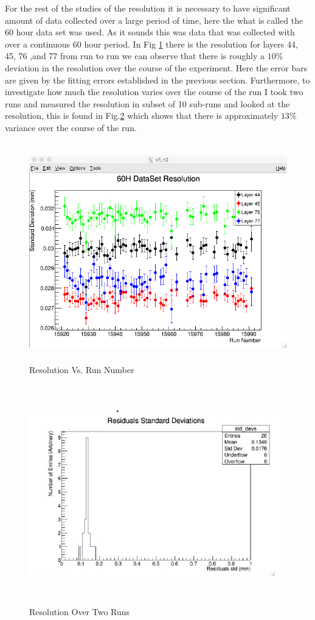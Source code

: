 \documentclass[./Thesis]{subfiles}
\begin{document}
	For the rest of the studies of the resolution it is necessary to have significant amount of data collected over a large period of time, here the what is called the 60 hour data set was used. As it sounds this was data that was collected with over a continuous 60 hour period. In Fig \ref{fig:ResNum} there is the resolution for layers 44, 45, 76 ,and 77 from run to run we can observe that there is roughly a $10\%$ deviation in the resolution over the course of the experiment. Here the error bars are given by the fitting errors established in the previous section. Furthermore, to investigate how much the resolution varies over the course of the run I took two runs and measured the resolution in subset of 10 sub-runs and looked at the resolution, this is found in Fig.\ref{fig:ResRun} which shows that there is approximately $13\%$ variance over the course of the run.
\begin{figure}
	\centerline{\includegraphics[height=95mm]{60HDataSetResidual.png}}
	\caption[60H Resolution]{ Resolution Vs. Run Number}
	\label{fig:ResNum}
\end{figure} 


\begin{figure}
	\centerline{\includegraphics[height=95mm]{ResidualsRun.jpeg}}
	\caption[Resolution Over Two Runs]{ Resolution Over Two Runs}
	\label{fig:ResRun}
\end{figure} 
\end{document}
